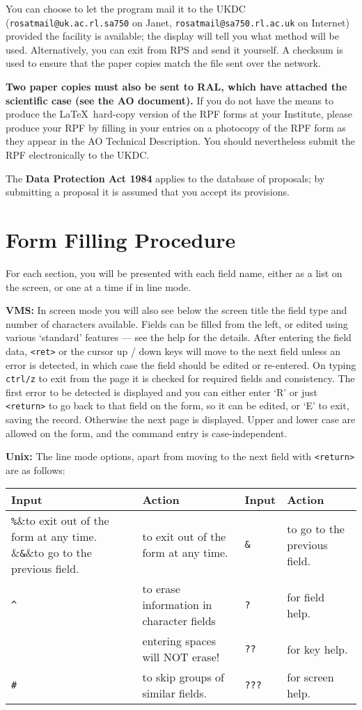 You can choose to let the program mail it to the UKDC
({\tt rosatmail@uk.ac.rl.sa750} on Janet, {\tt rosatmail@sa750.rl.ac.uk} on
Internet) provided the facility is available; the display will tell you
what method will be used.  Alternatively, you can exit from RPS and
send it yourself.  A checksum is used to ensure that the paper copies
match the file sent over the network.

{\bf Two paper copies must also be sent to RAL, which have attached the
scientific case (see the AO document). } If you do not have the means
to produce the \LaTeX\ hard-copy version of the RPF forms at your
Institute, please produce your RPF by filling in your entries on a
photocopy of the RPF form as they appear in the AO Technical
Description. You should nevertheless submit the RPF electronically to
the UKDC.

The {\bf Data Protection Act 1984} applies to the database of
proposals; by submitting a proposal it is assumed that you accept its
provisions.

\section{Form Filling Procedure}

For each section, you will be presented with each field name, either as
a list on the screen, or one at a time if in line mode.

{\bf VMS:} In screen mode you will also see below the screen title the
field type and number of characters available.  Fields can be filled
from the left, or edited using various `standard' features --- see the
help for the details.  After entering the field data, {\tt <ret>} or
the cursor up / down keys will move to the next field unless an error
is detected, in which case the field should be edited or re-entered. On
typing {\tt ctrl/z} to exit from the page it is checked for required
fields and consistency. The first error to be detected is displayed and
you can either enter `R' or just \verb+<return>+ to go back to that
field on the form, so it can be edited, or `E' to exit, saving the
record.  Otherwise the next page is displayed. Upper and lower case are
allowed on the form, and the command entry is case-independent.


{\bf Unix:} The line mode options, apart from moving to the next field
with \verb+<return>+ are as follows:

\begin{center}
\begin{tabular}{|ll|ll|} \hline
Input	&Action&Input	&Action\\ \hline
\verb+%+&to exit out of the form at any time.		&\verb+&+&to go to the previous field.\\
\verb+^+&to erase information in character fields	&\verb+?+&for field help.\\
        &entering spaces will NOT erase!		&\verb+??+&for key help.\\
\verb+#+&to skip groups of similar fields.		&\verb+???+&for screen help.\\ \hline
\end{tabular}
\end{center}


